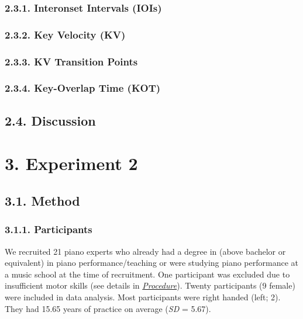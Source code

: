 \documentclass[
  english,
  man,floatsintext]{apa6}
\begin{document}
\hypertarget{interonset-intervals-iois-1}{%
\subsubsection{2.3.1. Interonset Intervals (IOIs)}\label{interonset-intervals-iois-1}}

\hypertarget{key-velocity-kv-1}{%
\subsubsection{2.3.2. Key Velocity (KV)}\label{key-velocity-kv-1}}

\hypertarget{kv-transition-points-1}{%
\subsubsection{2.3.3. KV Transition Points}\label{kv-transition-points-1}}

\hypertarget{key-overlap-time-kot-1}{%
\subsubsection{2.3.4. Key-Overlap Time (KOT)}\label{key-overlap-time-kot-1}}

\hypertarget{discussion}{%
\subsection{2.4. Discussion}\label{discussion}}

\newpage

\hypertarget{experiment-2}{%
\section{3. Experiment 2}\label{experiment-2}}

\hypertarget{method-1}{%
\subsection{3.1. Method}\label{method-1}}

\hypertarget{participants-1}{%
\subsubsection{3.1.1. Participants}\label{participants-1}}

We recruited 21 piano experts who already had a degree in (above bachelor or equivalent) in piano performance/teaching or were studying piano performance at a music school at the time of recruitment. One participant was excluded due to insufficient motor skills (see details in \emph{\protect\hyperlink{procedure-2}{Procedure}}). Twenty participants (9 female) were included in data analysis. Most participants were right handed (left; 2). They had 15.65 years of practice on average (\emph{SD} = 5.67).
\end{document}
